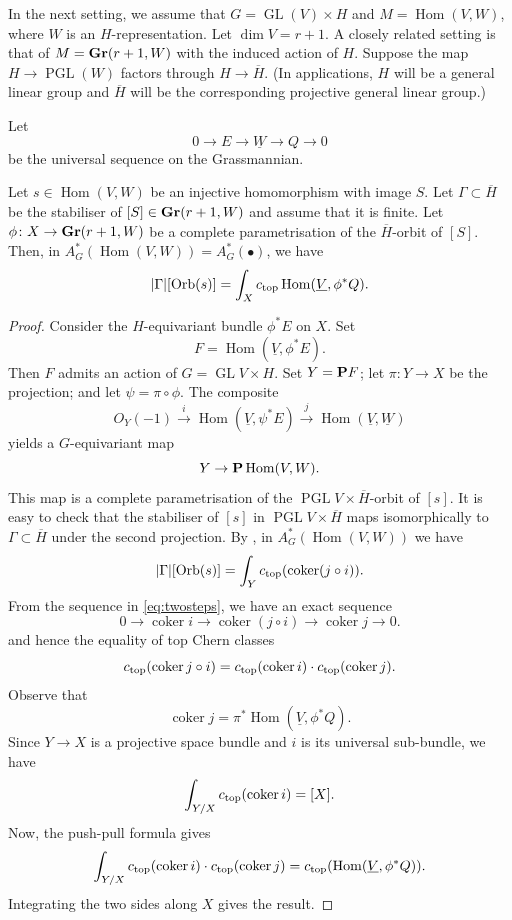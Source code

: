 \documentclass[11pt]{amsart}
\renewcommand {\P}{{\bf P}}
\providecommand {\Gr}{{\bf Gr}}
\providecommand{\GL}{\operatorname{GL}}
\providecommand{\PGL}{\operatorname{PGL}}
\providecommand{\coker}{\operatorname{coker}}
\providecommand{\Hom}{\operatorname{Hom}}
\DeclareMathOperator{\Orb}{Orb}
\begin{document}
In the next setting, we assume that \(G = \GL(V) \times H\) and \(M = \Hom(V, W)\), where \(W\) is an \(H\)-representation.
Let \(\dim V = r+1\).
A closely related setting is that of \(M = \Gr(r+1, W)\) with the induced action of \(H\).
Suppose the map \(H \to \PGL(W)\) factors through \(H \to \overline H\).
(In applications, \(H\) will be a general linear group and \(\overline H\) will be the corresponding projective general linear group.)

Let
\[ 0 \to E \to \underline W \to Q \to 0\]
be the universal sequence on the Grassmannian.
\begin{proposition}\label{prop:intgr}
  Let \(s \in \Hom(V, W)\) be an injective homomorphism with image \(S\).
  Let \(\Gamma \subset \overline H\) be the stabiliser of \([S] \in \Gr(r+1, W)\) and assume that it is finite.
  Let \(\phi \colon X \to \Gr(r+1, W)\) be a complete parametrisation of the \(\overline H\)-orbit of \([S]\).
  Then, in \(A^*_G(\Hom(V,W)) = A^*_G(\bullet)\), we have
  \[ |\Gamma|[\Orb(s)] = \int_X c_{\rm top} \Hom(\underline V, \phi^*Q).\]
\end{proposition}
\begin{proof}
  Consider the \(H\)-equivariant bundle \(\phi^* E\) on \(X\).
  Set
  \[F = \Hom(\underline V, \phi^*E).\]
  Then \(F\) admits an action of \(G = \GL V \times H\).
  Set \(Y = \P F\); let \(\pi \colon Y \to X\) be the projection; and let \(\psi = \pi \circ \phi\).
  The composite
  \begin{equation}\label{eq:twosteps}
    O_Y(-1) \xrightarrow{i} \Hom(\underline V , \psi^*E) \xrightarrow{j} \Hom(\underline V , \underline W)
    \end{equation}
  yields a \(G\)-equivariant map
  \[ Y \to \P \Hom(V, W).\]
  This map is a complete parametrisation of the \(\PGL V \times \overline H\)-orbit of \([s]\).
  It is easy to check that the stabiliser of \([s]\) in \(\PGL V \times \overline H\) maps isomorphically to \(\Gamma \subset \overline H\) under the second projection.
  By , in \(A^*_G(\Hom(V,W))\) we have
  \[ |\Gamma|[\Orb(s)] = \int_Y c_{\rm top}(\coker(j \circ i)).\]
  From the sequence in \eqref{eq:twosteps}, we have an exact sequence
  \[ 0 \to \coker i \to \coker(j \circ i) \to \coker j \to 0.\]
  and hence the equality of top Chern classes
  \[ c_{\rm top}(\coker j \circ i) = c_{\rm top}(\coker i) \cdot c_{\rm top}(\coker j).\]
  Observe that
  \[ \coker j = \pi^* \Hom(\underline V, \phi^* Q). \]
  Since \(Y \to X\) is a projective space bundle and \(i\) is its universal sub-bundle, we have
  \[ \int_{Y/X} c_{\rm top}(\coker i) = [X].\]
  Now, the push-pull formula gives
  \[
    \int_{Y/X} c_{\rm top}(\coker i) \cdot c_{\rm top}(\coker j) = c_{\rm top}(\Hom(\underline V, \phi^* Q)).
  \]
  Integrating the two sides along \(X\) gives the result.
\end{proof}
\end{document}
